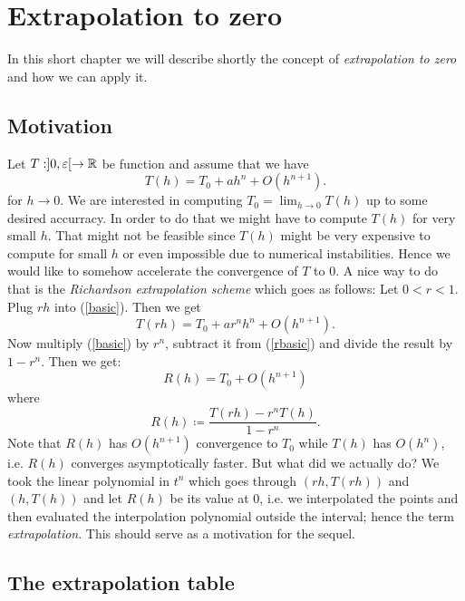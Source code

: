 \chapter{Extrapolation to zero}

In this short chapter we will describe shortly the concept of {\it extrapolation to zero} and how we can apply it.\\

\section{Motivation}

Let \(T: ]0, \varepsilon[ \rightarrow \mathbb{R}\) be function and assume that we have
\begin{equation}\label{basic}
T(h) = T_0 + a h^n + O(h^{n+1}).
\end{equation}
for \(h\rightarrow 0\). We are interested in computing \(T_0 = \lim_{h\rightarrow 0}T(h)\) up to some desired accurracy. In order to do that we might have to compute \(T(h)\) for very small \(h\). That might not be feasible since \(T(h)\) might be very expensive to compute for small \(h\) or even impossible due to numerical instabilities. Hence we would like to somehow accelerate the convergence of \(T\) to \(0\). A nice way to do that is the {\it Richardson extrapolation scheme} which goes as follows: Let \(0 < r < 1\). Plug \(rh\) into (\ref{basic}). Then we get
\begin{equation}\label{rbasic}
T(rh) = T_0 + a r^nh^n + O(h^{n+1}).
\end{equation}
Now multiply (\ref{basic}) by \(r^n\), subtract it from (\ref{rbasic}) and divide the result by \(1 - r^n\). Then we get:
\[
R(h) = T_0 + O(h^{n+1})
\]
where 
\[
R(h) \coloneqq \frac{T(rh) - r^nT(h)}{1 - r^n}.
\]
Note that \(R(h)\) has \(O(h^{n+1})\) convergence to \(T_0\) while \(T(h)\) has \(O(h^n)\), i.e. \(R(h)\) converges asymptotically faster. But what did we actually do? We took the linear polynomial in \(t^n\) which goes through \((rh, T(rh))\) and \((h, T(h))\) and let \(R(h)\) be its value at \(0\), i.e. we interpolated the points and then evaluated the interpolation polynomial outside the interval; hence the term {\it extrapolation}. This should serve as a motivation for the sequel.

\section{The extrapolation table}

